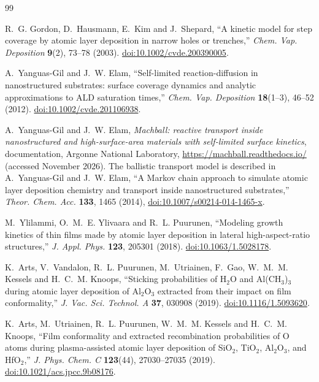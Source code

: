 \documentclass[11pt,letterpaper]{article}
\begin{document}
\begingroup
\small
\begin{thebibliography}{99}

R.~G. Gordon, D.~Hausmann, E.~Kim and J.~Shepard,
``A kinetic model for step coverage by atomic layer deposition in narrow holes or trenches,''
\emph{Chem. Vap. Deposition} \textbf{9}(2), 73--78 (2003).
\href{https://doi.org/10.1002/cvde.200390005}{doi:10.1002/cvde.200390005}.

A.~Yanguas-Gil and J.~W. Elam,
``Self-limited reaction-diffusion in nanostructured substrates: surface coverage dynamics and analytic approximations to ALD saturation times,''
\emph{Chem. Vap. Deposition} \textbf{18}(1--3), 46--52 (2012).
\href{https://doi.org/10.1002/cvde.201106938}{doi:10.1002/cvde.201106938}.

A.~Yanguas-Gil and J.~W. Elam,
\emph{Machball: reactive transport inside nanostructured and high-surface-area materials with self-limited surface kinetics}, documentation, Argonne National Laboratory,
\url{https://machball.readthedocs.io/} (accessed November 2026).
The ballistic transport model is described in A.~Yanguas-Gil and J.~W. Elam, ``A Markov chain approach to simulate atomic layer deposition chemistry and transport inside nanostructured substrates,'' \emph{Theor. Chem. Acc.} \textbf{133}, 1465 (2014), \href{https://doi.org/10.1007/s00214-014-1465-x}{doi:10.1007/s00214-014-1465-x}.

M.~Ylilammi, O.~M.~E. Ylivaara and R.~L. Puurunen,
``Modeling growth kinetics of thin films made by atomic layer deposition in lateral high-aspect-ratio structures,''
\emph{J. Appl. Phys.} \textbf{123}, 205301 (2018).
\href{https://doi.org/10.1063/1.5028178}{doi:10.1063/1.5028178}.

K.~Arts, V.~Vandalon, R.~L. Puurunen, M.~Utriainen, F.~Gao, W.~M.~M. Kessels and H.~C.~M. Knoops,
``Sticking probabilities of H$_2$O and Al(CH$_3$)$_3$ during atomic layer deposition of Al$_2$O$_3$ extracted from their impact on film conformality,''
\emph{J. Vac. Sci. Technol. A} \textbf{37}, 030908 (2019).
\href{https://doi.org/10.1116/1.5093620}{doi:10.1116/1.5093620}.

K.~Arts, M.~Utriainen, R.~L. Puurunen, W.~M.~M. Kessels and H.~C.~M. Knoops,
``Film conformality and extracted recombination probabilities of O atoms during plasma-assisted atomic layer deposition of SiO$_2$, TiO$_2$, Al$_2$O$_3$, and HfO$_2$,''
\emph{J. Phys. Chem. C} \textbf{123}(44), 27030--27035 (2019).
\href{https://doi.org/10.1021/acs.jpcc.9b08176}{doi:10.1021/acs.jpcc.9b08176}.


\end{thebibliography}
\end{document}
